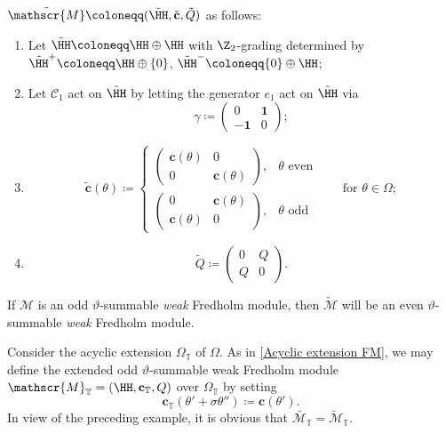 \documentclass[a4paper, english, 12pt, bibliography=totocnumbered,
index=totoc]{scrartcl}
\begin{document}
$\tilde{\mathscr{M}} \coloneqq (\tilde{\HH}, \tilde{\mathbf{c}},
\tilde{Q})$ as follows:
\begin{enumerate}
	\item Let $\tilde{\HH} \coloneqq \HH \oplus \HH$ with
	$\Z_2$-grading determined by $\tilde{\HH}^+ \coloneqq \HH \oplus
	\{0\}$,
	$\tilde{\HH}^- \coloneqq \{0\} \oplus \HH$;
	\item Let $\mathcal{C}_1$ act on $\tilde{\HH}$ by letting the
	generator
	$e_1$ act on $\tilde{\HH}$ via
	\begin{equation*}
		\gamma \coloneqq
		\begin{pmatrix}
			0 & \mathbf{1} \\
			-\mathbf{1} & 0
		\end{pmatrix};
	\end{equation*}
	\item
	\begin{equation*}
		\tilde{\mathbf{c}}(\theta) \coloneqq
		\begin{cases}
			\begin{pmatrix}
				\mathbf{c}(\theta) & 0 \\
				0 & \mathbf{c}(\theta)
			\end{pmatrix}, & \text{$\theta$ even} \\[15pt]
			\begin{pmatrix}
				0 & \mathbf{c}(\theta) \\
				\mathbf{c}(\theta) &0
			\end{pmatrix}, & \text{$\theta$ odd}
		\end{cases} \qquad \text{for $\theta \in \Omega$};
	\end{equation*}
	\item
	\begin{equation*}
		\tilde{Q} \coloneqq
		\begin{pmatrix}
			0 & Q \\
			Q & 0
		\end{pmatrix}.
	\end{equation*}
\end{enumerate}
\begin{rem}
	If $\mathscr{M}$ is an odd $\vartheta$-summable \textit{weak} Fredholm
	module, then $\tilde{\mathscr{M}}$ will be an even $\vartheta$-summable
	\textit{weak} Fredholm module.
\end{rem}
\begin{rem}\label{Doubling acyclic}
	Consider the acyclic extension $\Omega_{\mathbb{T}}$ of
	$\Omega$.
	As in \cref{Acyclic extension FM}, we may define the extended odd
	$\vartheta$-summable weak Fredholm module $\mathscr{M}_{\mathbb{T}} =
	(\HH,\mathbf{c}_{\mathbb{T}}, Q)$ over $\Omega_{\mathbb{T}}$ by setting
	\begin{equation*}
		\mathbf{c}_{\mathbb{T}}(\theta' + \sigma \theta'') \coloneqq
		\mathbf{c}(\theta').
	\end{equation*}
	In view of the preceding example, it is obvious that
	$\widetilde{\mathscr{M}_{\mathbb{T}}} =
	\tilde{\mathscr{M}}_{\mathbb{T}}$.
\end{rem}
\end{document}
